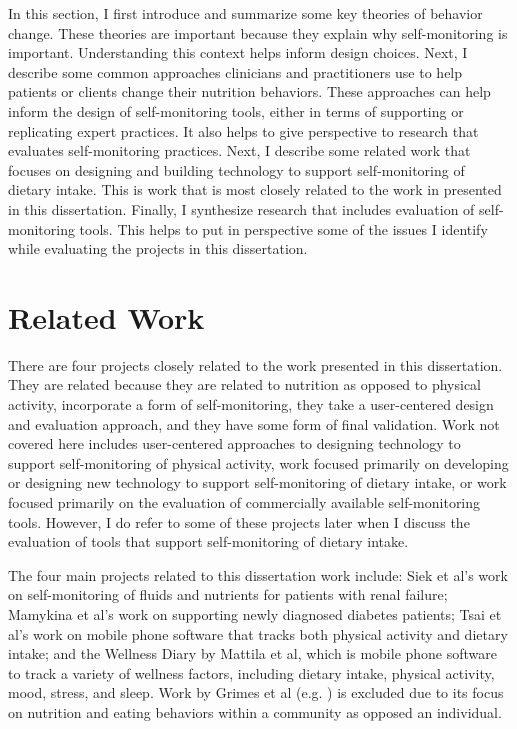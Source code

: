 In this section, I first introduce and summarize some key theories of behavior change. These theories are important because they explain why self-monitoring is important. Understanding this context helps inform design choices. Next, I describe some common approaches clinicians and practitioners use to help patients or clients change their nutrition behaviors. These approaches can help inform the design of self-monitoring tools, either in terms of supporting or replicating expert practices. It also helps to give perspective to research that evaluates self-monitoring practices. Next, I describe some related work that focuses on designing and building technology to support self-monitoring of dietary intake. This is work that is most closely related to the work in presented in this dissertation. Finally, I synthesize research that includes evaluation of self-monitoring tools. This helps to put in perspective some of the issues I identify while evaluating the projects in this dissertation.


\section{Related Work}
There are four projects closely related to the work presented in this dissertation. They are related because they are related to nutrition as opposed to physical activity, incorporate a form of self-monitoring, they take a user-centered design and evaluation approach, and they have some form of final validation. Work not covered here includes user-centered approaches to designing technology to support self-monitoring of physical activity, work focused primarily on developing or designing new technology to support self-monitoring of dietary intake, or work focused primarily on the evaluation of commercially available self-monitoring tools. However, I do refer to some of these projects later when I discuss the evaluation of tools that support self-monitoring of dietary intake. 

The four main projects related to this dissertation work include: Siek et al's \citep{siek_bridging_2009, siek_design_2006, siek_when_2006} work on self-monitoring of fluids and nutrients for patients with renal failure; Mamykina et al's work on supporting newly diagnosed diabetes patients; Tsai et al's work on mobile phone software that tracks both physical activity and dietary intake; and the Wellness Diary by Mattila et al, which is mobile phone software to track a variety of wellness factors, including dietary intake, physical activity, mood, stress, and sleep. Work by Grimes et al (e.g. ) is excluded due to its focus on nutrition and eating behaviors within a community as opposed an individual. 

